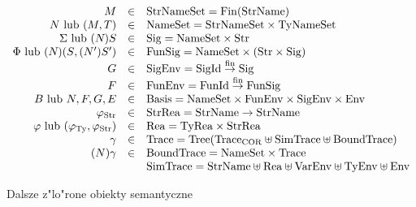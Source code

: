 \begin{figure}[h]
\begin{displaymath}
\begin{array}{rcl}
M              & \in   & {\rm StrNameSet} = \mathop{\rm Fin}\nolimits({\rm StrName})\\
N\ {\rm lub}\ (M,T)
                & \in   & {\rm NameSet} = {\rm StrNameSet}\times{\rm TyNameSet}\\
\Sigma\ {\rm lub}\ (N_{})S_{}
                & \in   & {\rm Sig} =  {\rm NameSet}\times{\rm Str} \\
\Phi\ {\rm lub}\ (N_{})(S_{},(N_{}')S_{} ')
                & \in   & {\rm FunSig} = {\rm NameSet}\times
                                         ({\rm Str}\times{\rm Sig})\\
G              & \in   & {\rm SigEnv}        =       {\rm SigId}\stackrel{{\rm fin}}{\to}{\rm Sig} \\
F              & \in   & {\rm FunEnv}        =       {\rm FunId}\stackrel{{\rm fin}}{\to}{\rm FunSig} \\
B\ {\rm lub}\ N,F,G,E
                & \in   & {\rm Basis} = {\rm NameSet}\times
                                              {\rm FunEnv}\times{\rm SigEnv}\times{\rm Env}\\
\varphi_{\rm Str}         & \in   & {\rm StrRea}={\rm StrName}\to{\rm StrName}\\
\varphi\ {\rm lub}\ (\varphi_{\rm Ty},\varphi_{\rm Str}){}
                & \in   & \mbox{Rea}={\rm TyRea}\times{\rm StrRea}\\
\gamma &\in&\mbox{Trace}=\mbox{Tree}(\mbox{Trace}_{\rm COR}\uplus\mbox{SimTrace}\uplus\mbox{BoundTrace})\\
(N)\gamma&\in&\mbox{BoundTrace}={\rm NameSet}\times\mbox{Trace}\\
&&\mbox{SimTrace} = {\rm StrName}\uplus\mbox{Rea}\uplus{\rm VarEnv}\uplus{\rm TyEnv}\uplus{\rm Env}\\
\end{array}
\end{displaymath}
\caption{Dalsze z"lo"rone obiekty semantyczne}
\label{module-objects}
\end{figure}

\clearpage





